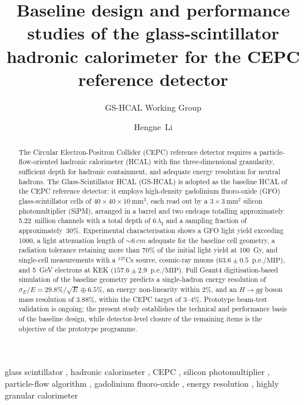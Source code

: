 \documentclass[preprint,12pt,times]{elsarticle}
\newcommand{\lambdaI}{\ensuremath{\lambda_{\mathrm{I}}}\xspace}
\newcommand{\peMIP}{\ensuremath{\text{p.e.}/\text{MIP}}\xspace}
\newcommand{\cellsize}{\ensuremath{40\times40\times10~\text{mm}^{3}}\xspace}
\newcommand{\sipmsize}{\ensuremath{3\times3~\text{mm}^{2}}\xspace}
\begin{document}
\begin{frontmatter}

\title{Baseline design and performance studies of the glass-scintillator
hadronic calorimeter for the CEPC reference detector}

\author[scnu]{GS-HCAL Working Group}

\author[scnu]{Hengne~Li}


\begin{abstract}
The Circular Electron-Positron Collider (CEPC) reference detector
requires a particle-flow-oriented hadronic calorimeter (HCAL) with
fine three-dimensional granularity, sufficient depth for hadronic
containment, and adequate energy resolution for neutral hadrons.
The Glass-Scintillator HCAL (GS-HCAL) is adopted as the baseline HCAL
of the CEPC reference detector: it employs high-density gadolinium
fluoro-oxide (GFO) glass-scintillator cells of \cellsize, each read
out by a \sipmsize silicon photomultiplier (SiPM), arranged in a
barrel and two endcaps totalling approximately 5.22~million channels
with a total depth of $6\,\lambdaI$ and a sampling fraction of
approximately~30\%.
Experimental characterisation shows a GFO light yield exceeding
\SI{1000}{\phMeV}, a light attenuation length of ${\sim}\SI{6}{cm}$
adequate for the baseline cell geometry, a radiation tolerance
retaining more than 70\% of the initial light yield at \SI{100}{Gy},
and single-cell measurements with a $^{137}$Cs source, cosmic-ray
muons ($63.6\pm0.5$~\peMIP), and \SI{5}{GeV} electrons at KEK
($157.6\pm2.9$~\peMIP).
Full Geant4 digitisation-based simulation of the baseline geometry
predicts a single-hadron energy resolution of
$\sigma_{E}/E = 29.8\%/\sqrt{E}\oplus6.5\%$, an energy non-linearity
within 2\%, and an $H\to gg$ boson mass resolution of 3.88\%, within
the CEPC target of 3--4\%.
Prototype beam-test validation is ongoing; the present study
establishes the technical and performance basis of the baseline
design, while detector-level closure of the remaining items is the
objective of the prototype programme.
\end{abstract}

\begin{keyword}
glass scintillator \sep
hadronic calorimeter \sep
CEPC \sep
silicon photomultiplier \sep
particle-flow algorithm \sep
gadolinium fluoro-oxide \sep
energy resolution \sep
highly granular calorimeter
\end{keyword}

\end{frontmatter}

\linenumbers



\end{document}
